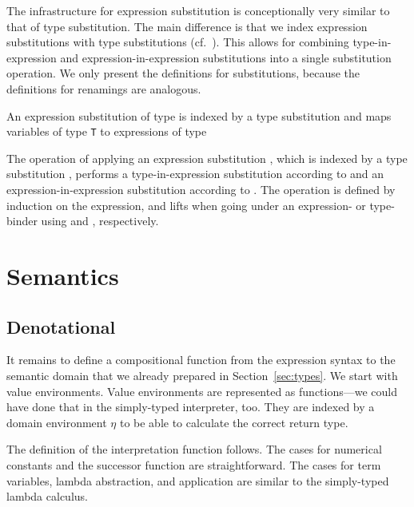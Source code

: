 \documentclass[acmsmall,anonymous,review,screen]{acmart}
\begin{document}
The infrastructure for expression substitution is conceptionally very similar to
that of type substitution.
The main difference is that we index expression substitutions with
type substitutions (cf.~\cite{DBLP:conf/mpc/ChapmanKNW19}).
This allows for combining type-in-expression and
expression-in-expression substitutions into a single substitution
operation. We only present the definitions for substitutions, because
the definitions for renamings are analogous.

An expression substitution of type {\AESub} is indexed by a type
substitution {\AsigmaStar} and maps variables of type \texttt{T}
to expressions of type 
\SubDefESub

The operation of applying an expression substitution {\Asigma}, which
is indexed by a type substitution {\AsigmaStar}, performs a
type-in-expression substitution according to {\AsigmaStar} and an
expression-in-expression substitution according to {\Asigma}.
The operation is defined by induction on the expression, and lifts {\Asigma} when
going under an expression- or type-binder using {\AEliftS} and
{\AEliftSL}, respectively.
\SubDefEsub

\SubDefECompositionSS

\EFFusionSubSub


\section{Semantics}
\label{sec:semantics}

\subsection{Denotational}
\label{sec:denotational}



It remains to define a compositional function from the expression
syntax to the semantic domain that we already prepared in
Section~\ref{sec:types}. We start with value environments.
\TFVEnv
Value environments are represented as functions---we could have done
that in the simply-typed interpreter, too. They are indexed by a
domain environment $\eta$ to be able to calculate the correct return type.

The definition of the interpretation function follows.
\TFExprSem
The cases for numerical constants and the successor function are straightforward.
The cases for term variables, lambda abstraction, and application are
similar to the  simply-typed lambda calculus.
\end{document}

